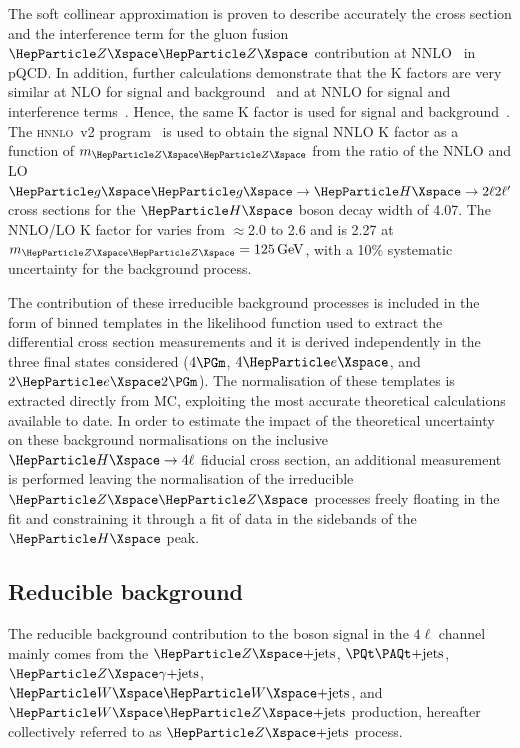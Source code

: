 The soft collinear approximation is proven to describe accurately the cross section and the interference term for the gluon fusion $\PZ\PZ$ contribution at NNLO\@~\cite{Bonvini:1304.3053} in pQCD.
In addition, further calculations demonstrate that the K factors are very similar at NLO for signal and background~\cite{Melnikov:2015laa} and at NNLO for signal and interference terms~\cite{Li:2015jva}.
Hence, the same K factor is used for signal and background~\cite{Passarino:1312.2397v1}.
The \textsc{hnnlo}~v2 program~\cite{Catani:2007vq,Grazzini:2008tf,Grazzini:2013mca} is used to obtain the signal NNLO K factor as a function of $m_{\PZ\PZ}$ from the ratio of the NNLO and LO $\Pg\Pg\to\PH\to2\ell2\ell^\prime$ cross sections for the $\PH$ boson decay width of 4.07\MeV. 
The NNLO/LO K factor for {\ggZZ} varies from $\approx$2.0 to 2.6 and is 2.27 at $m_{\PZ\PZ}=125\GeV$, with a 10\% systematic uncertainty for the background process.


The contribution of these irreducible background processes is included in the form of binned templates in the likelihood function used to extract the differential cross section measurements and it is derived independently in the three final states considered ($4\Pgm$, $4\Pe$, and $2\Pe 2\Pgm$).
The normalisation of these templates is extracted directly from MC, exploiting the most accurate theoretical calculations available to date.
In order to estimate the impact of the theoretical uncertainty on these background normalisations on the inclusive $\Hllll$ fiducial cross section, an additional measurement is performed leaving the normalisation of the irreducible $\PZ\PZ$ processes freely floating in the fit and constraining it through a fit of data in the sidebands of the $\PH$ peak.

\subsection{Reducible background}
\label{sec:redbkgd}
The reducible background contribution to the \PH boson signal in the $4\ell$ channel mainly comes from the $\PZ\text{+jets}$,  $\ttbar\text{+jets}$,
$\PZ\gamma\text{+jets}$, $\PW\PW\text{+jets}$, and $\PW\PZ\text{+jets}$ production, hereafter collectively referred to as $\PZ\text{+jets}$ process.

